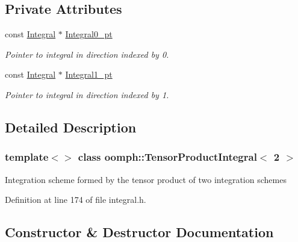 \subsection*{Private Attributes}
\begin{DoxyCompactItemize}
\item 
const \hyperlink{classoomph_1_1Integral}{Integral} $\ast$ \hyperlink{classoomph_1_1TensorProductIntegral_3_012_01_4_a9f009fce849704b680b2b79ceaaf83b9}{Integral0\+\_\+pt}
\begin{DoxyCompactList}\small\item\em Pointer to integral in direction indexed by 0. \end{DoxyCompactList}\item 
const \hyperlink{classoomph_1_1Integral}{Integral} $\ast$ \hyperlink{classoomph_1_1TensorProductIntegral_3_012_01_4_a410c83f19a1328c65d0753882f95b529}{Integral1\+\_\+pt}
\begin{DoxyCompactList}\small\item\em Pointer to integral in direction indexed by 1. \end{DoxyCompactList}\end{DoxyCompactItemize}


\subsection{Detailed Description}
\subsubsection*{template$<$$>$\newline
class oomph\+::\+Tensor\+Product\+Integral$<$ 2 $>$}

Integration scheme formed by the tensor product of two integration schemes 

Definition at line 174 of file integral.\+h.



\subsection{Constructor \& Destructor Documentation}
\mbox{\label{classoomph_1_1TensorProductIntegral_3_012_01_4_add2a69abc8eccc5f769117d8b72548b6}} 
